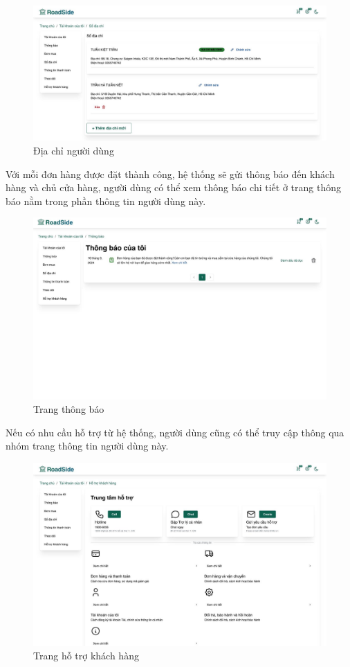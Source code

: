 \begin{figure}[H]
    \centering
    \includegraphics[scale=0.3] {Images/UI/address2.png}
    \vspace{1em}
    \caption{Địa chỉ người dùng}
\end{figure}
Với mỗi đơn hàng được đặt thành công, hệ thống sẽ gửi thông báo đến khách hàng và chủ cửa hàng, người dùng có thể xem thông báo chi tiết ở trang thông báo nằm trong phần thông tin người dùng này.
\begin{figure}[H]
    \centering
    \includegraphics[width=\linewidth] {Images/UI/noti.png}
    \vspace{1em}
    \caption{Trang thông báo}
\end{figure}
Nếu có nhu cầu hỗ trợ từ hệ thống, người dùng cũng có thể truy cập thông qua nhóm trang thông tin người dùng này.
\begin{figure}[H]
    \centering
    \includegraphics[width=\linewidth] {Images/UI/helpcenter.png}
    \vspace{1em}
    \caption{Trang hỗ trợ khách hàng}
\end{figure}
